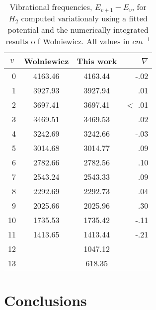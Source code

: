 \begin{table}[tbp] \centering%
\begin{tabular}{cccr}
\hline\hline
$v$ & Wolniewicz & This work & $\nabla $ \\ \hline
\multicolumn{1}{r}{0} & 4163.46 & 4163.44 & -.02 \\ 
\multicolumn{1}{r}{1} & 3927.93 & 3927.94 & .01 \\ 
\multicolumn{1}{r}{2} & 3697.41 & 3697.41 & 
\mbox{$<$}%
.01 \\ 
\multicolumn{1}{r}{3} & 3469.51 & 3469.53 & .02 \\ 
\multicolumn{1}{r}{4} & 3242.69 & 3242.66 & -.03 \\ 
\multicolumn{1}{r}{5} & 3014.68 & 3014.77 & .09 \\ 
\multicolumn{1}{r}{6} & 2782.66 & 2782.56 & .10 \\ 
\multicolumn{1}{r}{7} & 2543.24 & 2543.33 & .09 \\ 
\multicolumn{1}{r}{8} & 2292.69 & 2292.73 & .04 \\ 
\multicolumn{1}{r}{9} & 2025.66 & 2025.96 & .30 \\ 
\multicolumn{1}{r}{10} & 1735.53 & 1735.42 & -.11 \\ 
\multicolumn{1}{r}{11} & 1413.65 & 1413.44 & -.21 \\ 
\multicolumn{1}{r}{12} &  & 1047.12 &  \\ 
\multicolumn{1}{r}{13} &  & 618.35 &  \\ \hline
\end{tabular}
\caption{Vibrational frequencies, $ E_{v+1}-E_{v }$,  for $ H_2 $ computed variationaly
 using a fitted potential  and the numerically integrated results o f Wolniewicz.
 All values in $ cm^{-1} $ } \label{freqtab}%
\end{table}%

\section{Conclusions}


